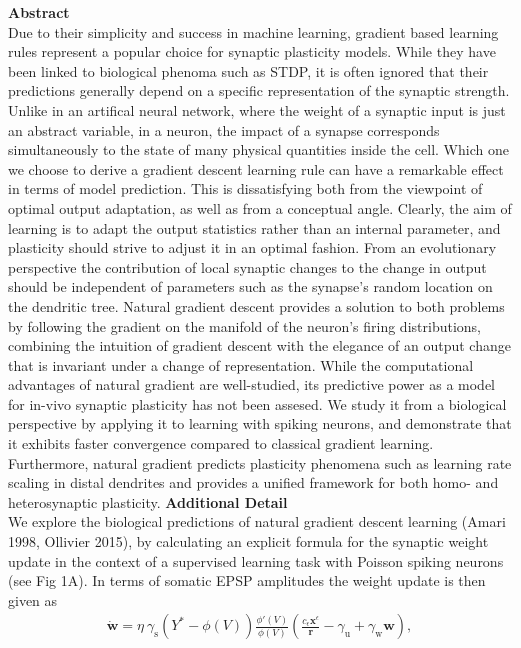 \documentclass[12pt]{article}
\newcommand{\lb}{\left}
\newcommand{\mb}{\mathbf}
\newcommand{\mrm}{\mathrm}
\newcommand{\rb}{\right}
\newcommand{\xeps}{\mathbf x^{\epsilon}}
\begin{document}
\setlength{\abovedisplayskip}{3pt}
\setlength{\belowdisplayskip}{3pt}
{\center\bf Abstract}\\
Due to their simplicity and success in machine learning, gradient based learning rules represent a popular choice for synaptic plasticity models. While they have been linked to biological phenoma such as STDP, it is often ignored that their predictions generally depend on a specific representation of the synaptic strength. Unlike in an artifical neural network, where the weight of a synaptic input is just an abstract variable, in a neuron, the impact of a synapse corresponds simultaneously to the state of many physical quantities inside the cell. Which one we choose to derive a gradient descent learning rule can have a remarkable effect in terms of model prediction.
This is dissatisfying both from the viewpoint of optimal output adaptation, as well as from a conceptual angle. Clearly, the aim of learning is to adapt the output statistics rather than an internal parameter, and plasticity should strive to adjust it in an optimal fashion. From an evolutionary perspective the contribution of local synaptic changes to the change in output should be independent of parameters such as the synapse's random location on the dendritic tree. 
Natural gradient descent provides a solution to both problems by following the gradient on the manifold of the neuron's firing distributions, combining the intuition of gradient descent with the elegance of an output change that is invariant under a change of representation. While the computational advantages of natural gradient are well-studied, its predictive power as a model for in-vivo synaptic plasticity has not been assesed. We study it from a biological perspective by applying it to learning with spiking neurons,  and demonstrate that it exhibits faster convergence compared to classical gradient learning. Furthermore, natural gradient predicts plasticity phenomena such as learning rate scaling in distal dendrites and provides a unified framework for both homo- and heterosynaptic plasticity.
{\center\bf Additional Detail}\\
We explore the biological predictions of natural gradient descent learning (Amari 1998, Ollivier 2015), by calculating an explicit formula for the synaptic weight update in the context of a supervised learning task with Poisson spiking neurons (see Fig 1A). In terms of somatic EPSP amplitudes the weight update is then given as 
\begin{eqnarray}
\label{Results_Natural_Gradient}
\dot{\mb w} =\eta \ \gamma_{\mrm s} \lb(Y^*-\phi(V)\rb) \frac{\phi'(V)}{\phi(V)}\lb(\frac{c_{\epsilon}\xeps}{\mb r}-\gamma_{\mrm u}+\gamma_{\mrm w}{\mb w}\rb),
\end{eqnarray} 
\end{document}
